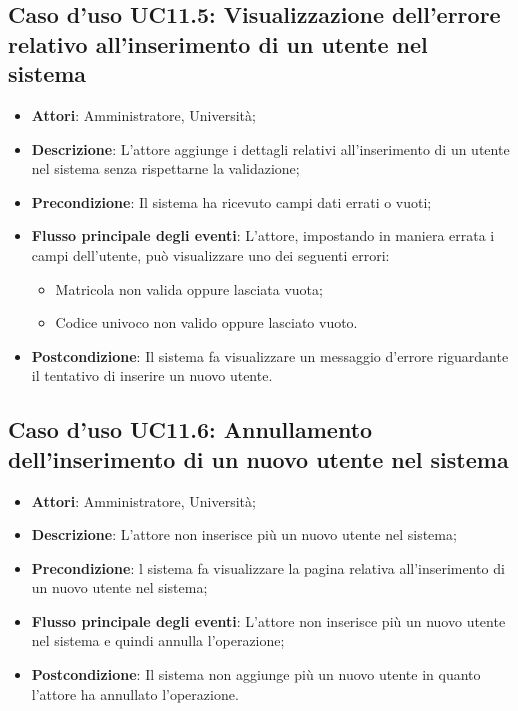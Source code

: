 \subsection{Caso d'uso \texorpdfstring{UC11.5}{UC11.5}: Visualizzazione dell'errore relativo all'inserimento di un utente nel sistema}
\begin{itemize}
	\item \textbf{Attori}: Amministratore, Università;
	\item \textbf{Descrizione}: L'attore aggiunge i dettagli relativi all'inserimento di un utente nel sistema senza rispettarne la validazione;
	\item \textbf{Precondizione}: Il sistema ha ricevuto campi dati errati o vuoti;
	
	
	\item \textbf{Flusso principale degli eventi}: L'attore, impostando in maniera errata i campi dell'utente, può visualizzare uno dei seguenti errori:
	\begin{itemize}
		\item Matricola non valida oppure lasciata vuota;
		\item Codice univoco non valido oppure lasciato vuoto.
	\end{itemize}
	\item \textbf{Postcondizione}: Il sistema fa visualizzare un messaggio d'errore riguardante il tentativo di inserire un nuovo utente.
	
\end{itemize}
\subsection{Caso d'uso \texorpdfstring{UC11.6}{UC11.6}: Annullamento dell'inserimento di un nuovo utente nel sistema}
\begin{itemize}
	\item \textbf{Attori}: Amministratore, Università;
	\item \textbf{Descrizione}: L'attore non inserisce più un nuovo utente nel sistema;
	\item \textbf{Precondizione}: l sistema fa visualizzare la pagina relativa all'inserimento di un nuovo utente nel sistema;
	
	\item \textbf{Flusso principale degli eventi}: L'attore non inserisce più un nuovo utente nel sistema e quindi annulla l'operazione;
	\item \textbf{Postcondizione}: Il sistema non aggiunge più un nuovo utente in quanto l'attore ha annullato l'operazione.
	
\end{itemize}
